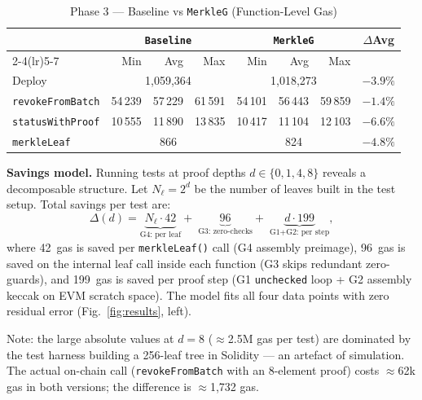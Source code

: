 \documentclass[conference]{IEEEtran}
\begin{document}
\begin{table}[t]
\centering
\caption{Phase 3 — Baseline vs \texttt{MerkleG} (Function-Level Gas)}
\label{tab:phase3}
\setlength{\tabcolsep}{3.5pt}
\begin{tabular}{lrrrrrrc}
\toprule
& \multicolumn{3}{c}{\texttt{Baseline}} & \multicolumn{3}{c}{\texttt{MerkleG}} & $\Delta$Avg \\
\cmidrule(lr){2-4}\cmidrule(lr){5-7}
& Min & Avg & Max & Min & Avg & Max & \\
\midrule
Deploy         & \multicolumn{3}{c}{1{,}059{,}364}
               & \multicolumn{3}{c}{1{,}018{,}273} & $-3.9\%$ \\
\texttt{revokeFromBatch}
               & 54\,239 & 57\,229 & 61\,591
               & 54\,101 & 56\,443 & 59\,859 & $-1.4\%$ \\
\texttt{statusWithProof}
               & 10\,555 & 11\,890 & 13\,835
               & 10\,417 & 11\,104 & 12\,103 & \textbf{$-6.6\%$} \\
\texttt{merkleLeaf}
               & \multicolumn{3}{c}{866}
               & \multicolumn{3}{c}{824} & $-4.8\%$ \\
\bottomrule
\end{tabular}
\end{table}

\medskip
\noindent\textbf{Savings model.}
Running tests at proof depths $d \in \{0,1,4,8\}$
reveals a decomposable structure.
Let $N_\ell = 2^d$ be the number of leaves built in the test setup.
Total savings per test are:
\begin{equation}
\Delta(d) =
  \underbrace{N_\ell \cdot 42}_{\text{G4: per leaf}}
  +\;
  \underbrace{96}_{\text{G3: zero-checks}}
  +\;
  \underbrace{d \cdot 199}_{\text{G1+G2: per step}},
\label{eq:model}
\end{equation}
where 42~gas is saved per \texttt{merkleLeaf()} call (G4 assembly preimage),
96~gas is saved on the internal leaf call inside each function
(G3 skips redundant zero-guards), and 199~gas is saved per proof
step (G1 \texttt{unchecked} loop + G2 assembly keccak on EVM scratch space).
The model fits all four data points with zero residual error
(Fig.~\ref{fig:results}, left).

Note: the large absolute values at $d=8$ ($\approx$2.5M gas per test)
are dominated by the test harness building a 256-leaf tree in Solidity
— an artefact of simulation.
The actual on-chain call (\texttt{revokeFromBatch} with an 8-element
proof) costs $\approx$62k gas in both versions; the difference
is $\approx$1,732 gas.
\end{document}
